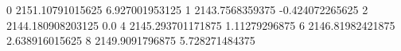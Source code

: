 0 2151.10791015625 6.927001953125
1 2143.7568359375 -0.424072265625
2 2144.180908203125 0.0
4 2145.293701171875 1.11279296875
6 2146.81982421875 2.638916015625
8 2149.9091796875 5.728271484375
